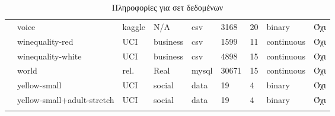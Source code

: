 {\begin{longtable}{|l| l| l | l | l | l |l | l | l | }
 					\rownumber & voice \citep{voice} & kaggle & N/A & csv & 3168 & 20 & binary & Όχι \\
 					\rownumber & winequality-red & UCI & business & csv & 1599 & 11 & continuous & Όχι \\
 					\rownumber & winequality-white & UCI & business & csv & 4898 & 15 & continuous & Όχι \\
 					\rownumber & world & rel. & Real & mysql & 30671 & 15 & continuous & Όχι \\
 					\rownumber & yellow-small \citep{balloons}  & UCI & social & data  & 19 & 4 & binary & Όχι\\
 					\rownumber & yellow-small+adult-stretch \citep{balloons}  & UCI & social & data  & 19& 4 & binary & Όχι\\
			\hline   
			\caption{Πληροφορίες για σετ δεδομένων}\label{mfs} 
 \end{longtable}
}
